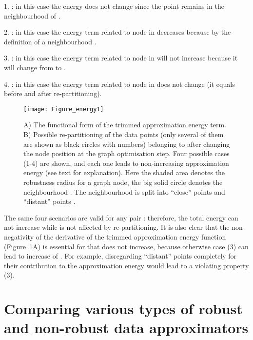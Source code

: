 \documentclass[graybox]{archivesofdatascience}
\begin{document}
1. : in this case the energy  does not change since the point  remains in the neighbourhood of .

2. : in this case the energy term related to  node in  decreases because by the definition of a neighbourhood .

3. : in this case the energy term related to  node in  will not increase because it will change from  to .

4. : in this case the energy term related to  node in   does not change (it equals  before and after re-partitioning).

\begin{figure}[tbp]
\texttt{[image: Figure\_energy1]}
\caption{A) The functional form of the trimmed approximation energy term. B) Possible re-partitioning of the data points (only several of them are shown as black circles with numbers) belonging to  after changing the node position at the graph optimisation step. Four possible cases (1-4) are shown, and each one leads to non-increasing approximation energy (see text for explanation). Here the shaded area denotes the robustness radius  for a graph node, the big solid circle denotes the neighbourhood . The neighbourhood  is split into ``close'' points  and ``distant'' points . }
\label{FIGUREENERGY}       \end{figure}

The same four scenarios are valid for any pair : therefore, the total energy  can not increase while  is not affected by re-partitioning. It is also clear that the non-negativity of the derivative of the trimmed approximation energy function (Figure~\ref{FIGUREENERGY}A) is essential for that  does not increase, because otherwise case (3) can lead to increase of . For example, disregarding ``distant'' points completely for their contribution to the approximation energy would lead to a violating property (3).

\iffalse
At the same time, it is possible to modify (\ref{robustApproximationTerm}) in such a way that the ``distant'' points  will influence the new positioning of the nodes  at the graph optimisation step. For example, it can look like



\noindent where



\noindent and position of  in  is fixed during the computation of energy derivative at the graph optimization step.
\fi

\section{Comparing various types of robust and non-robust data approximators}\label{Result}
\end{document}
